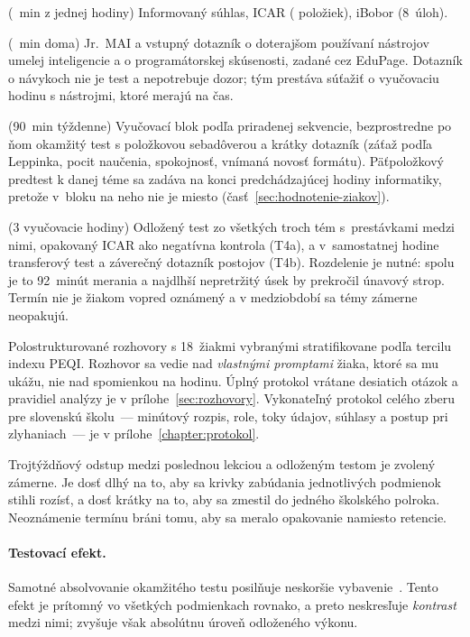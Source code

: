 \begin{description}[leftmargin=2.2cm, style=nextline, nosep]
    \item[T0a, týždeň 0] (\mplMinToa~min z jednej hodiny) Informovaný súhlas, ICAR (\mplGfItems{} položiek), iBobor (8~úloh).
    \item[T0b, týždeň 0] (\mplMinTob~min doma) Jr.~MAI a vstupný dotazník o doterajšom používaní nástrojov umelej inteligencie a o programátorskej skúsenosti, zadané cez EduPage. Dotazník o návykoch nie je test a nepotrebuje dozor; tým prestáva súťažiť o vyučovaciu hodinu s nástrojmi, ktoré merajú na čas.
    \item[P1--P3, týždne 1--3] (90~min týždenne) Vyučovací blok podľa priradenej sekvencie, bezprostredne po ňom okamžitý test s položkovou sebadôverou a krátky dotazník (záťaž podľa Leppinka, pocit naučenia, spokojnosť, vnímaná novosť formátu). Päťpoložkový predtest k danej téme sa zadáva na konci predchádzajúcej hodiny informatiky, pretože v~bloku na neho nie je miesto (časť~\ref{sec:hodnotenie-ziakov}).
    \item[T4a a T4b, týždeň 6] (3 vyučovacie hodiny) Odložený test zo všetkých troch tém s~prestávkami medzi nimi, opakovaný ICAR ako negatívna kontrola (T4a), a v~samostatnej hodine transferový test a záverečný dotazník postojov (T4b). Rozdelenie je nutné: spolu je to 92~minút merania a najdlhší nepretržitý úsek by prekročil únavový strop. Termín nie je žiakom vopred oznámený a v medziobdobí sa témy zámerne neopakujú.
    \item[T5, týždeň 7] Polostrukturované rozhovory s 18~žiakmi vybranými stratifikovane podľa tercilu indexu PEQI. Rozhovor sa vedie nad \emph{vlastnými promptami} žiaka, ktoré sa mu ukážu, nie nad spomienkou na hodinu. Úplný protokol vrátane desiatich otázok a pravidiel analýzy je v prílohe~\ref{sec:rozhovory}. Vykonateľný protokol celého zberu pre slovenskú školu~--- minútový rozpis, role, toky údajov, súhlasy a postup pri zlyhaniach~--- je v prílohe~\ref{chapter:protokol}.
\end{description}

Trojtýždňový odstup medzi poslednou lekciou a odloženým testom je zvolený zámerne. Je dosť dlhý na to, aby sa krivky zabúdania jednotlivých podmienok stihli rozísť, a dosť krátky na to, aby sa zmestil do jedného školského polroka. Neoznámenie termínu bráni tomu, aby sa meralo opakovanie namiesto retencie.

\paragraph{Testovací efekt.} Samotné absolvovanie okamžitého testu posilňuje neskoršie vybavenie~\cite{roediger2006test}. Tento efekt je prítomný vo všetkých podmienkach rovnako, a preto neskresľuje \emph{kontrast} medzi nimi; zvyšuje však absolútnu úroveň odloženého výkonu.

